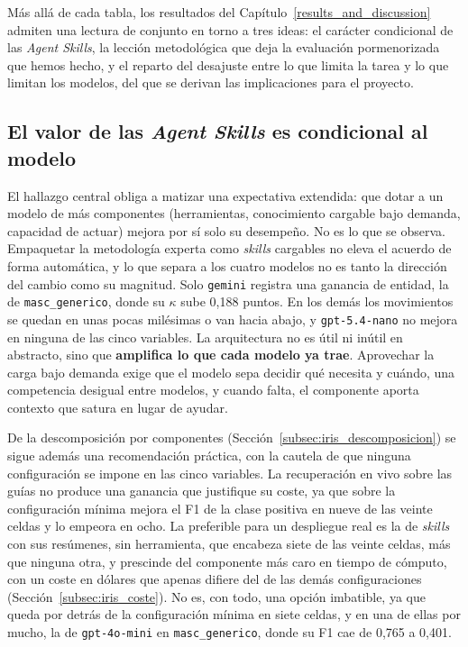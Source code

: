 
Más allá de cada tabla, los resultados del Capítulo~\ref{results_and_discussion} admiten una lectura de conjunto
en torno a tres ideas: el carácter condicional de las \textit{Agent Skills}, la
lección metodológica que deja la evaluación pormenorizada que hemos hecho, y el
reparto del desajuste entre lo que limita la tarea y lo que limitan los modelos, del
que se derivan las implicaciones para el proyecto.

\subsection{El valor de las \textit{Agent Skills} es condicional al modelo}

El hallazgo central obliga a matizar una expectativa extendida: que dotar a un modelo
de más componentes (herramientas, conocimiento cargable bajo demanda, capacidad de
actuar) mejora por sí solo su desempeño. No es lo que se observa. Empaquetar la
metodología experta como \textit{skills} cargables no eleva el acuerdo de forma
automática, y lo que separa a los cuatro modelos no es tanto la dirección del cambio
como su magnitud. Solo \texttt{gemini} registra una ganancia de entidad, la de
\texttt{masc\_generico}, donde su $\kappa$ sube 0,188 puntos. En los demás los
movimientos se quedan en unas pocas milésimas o van hacia abajo, y
\texttt{gpt-5.4-nano} no mejora en ninguna de las cinco variables. La arquitectura no
es útil ni inútil en abstracto, sino que \textbf{amplifica lo que cada modelo ya
trae}. Aprovechar la carga bajo demanda exige que el modelo sepa decidir qué necesita
y cuándo, una competencia desigual entre modelos, y cuando falta, el componente aporta
contexto que satura en lugar de ayudar.

De la descomposición por componentes (Sección~\ref{subsec:iris_descomposicion}) se
sigue además una recomendación práctica, con la cautela de que ninguna configuración
se impone en las cinco variables. La recuperación en vivo sobre las guías no produce
una ganancia que justifique su coste, ya que sobre la configuración mínima mejora el
F1 de la clase positiva en nueve de las veinte celdas y lo empeora en ocho. La
preferible para un despliegue real es la de \textit{skills} con sus resúmenes, sin
herramienta, que encabeza siete de las veinte celdas, más que ninguna otra, y prescinde del
componente más caro en tiempo de cómputo, con un coste en dólares que apenas
difiere del de las demás configuraciones (Sección~\ref{subsec:iris_coste}). No es, con todo, una opción imbatible, ya que queda
por detrás de la configuración mínima en siete celdas, y en una de ellas por mucho, la
de \texttt{gpt-4o-mini} en \texttt{masc\_generico}, donde su F1 cae de 0,765 a
0,401.

